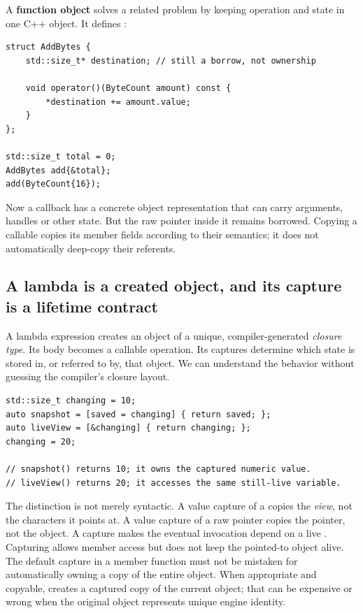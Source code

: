 A \textbf{function object} solves a related problem by keeping operation and state in one C++ object. It defines :

\begin{verbatim}
struct AddBytes {
    std::size_t* destination; // still a borrow, not ownership

    void operator()(ByteCount amount) const {
        *destination += amount.value;
    }
};

std::size_t total = 0;
AddBytes add{&total};
add(ByteCount{16});
\end{verbatim}

Now a callback has a concrete object representation that can carry arguments, handles or other state. But the raw pointer inside it remains borrowed. Copying a callable copies its member fields according to their semantics; it does not automatically deep-copy their referents.

\subsection{A lambda is a created object, and its capture is a lifetime contract}\label{01-foundations-i-ch004-a-lambda-is-a-created-object-and-its-capture-is-a-lifetime-contract}

\hypertarget{01-foundations-i-ch004-a-lambda-is-a-created-object-and-its-capture-is-a-lifetime-contract}{}

A lambda expression creates an object of a unique, compiler-generated \emph{closure type}. Its body becomes a callable operation. Its captures determine which state is stored in, or referred to by, that object. We can understand the behavior without guessing the compiler's closure layout.

\begin{verbatim}
std::size_t changing = 10;
auto snapshot = [saved = changing] { return saved; };
auto liveView = [&changing] { return changing; };
changing = 20;

// snapshot() returns 10; it owns the captured numeric value.
// liveView() returns 20; it accesses the same still-live variable.
\end{verbatim}

The distinction is not merely syntactic. A value capture of a  copies the \emph{view}, not the characters it points at. A value capture of a raw pointer copies the pointer, not the object. A \BookInlineCode{{[}\&scene{]}} capture makes the eventual invocation depend on a live . Capturing  allows member access but does not keep the pointed-to object alive. The \BookInlineCode{{[}={]}} default capture in a member function must not be mistaken for automatically owning a copy of the entire object. When appropriate and copyable, \BookInlineCode{{[}*this{]}} creates a captured copy of the current object; that can be expensive or wrong when the original object represents unique engine identity.

